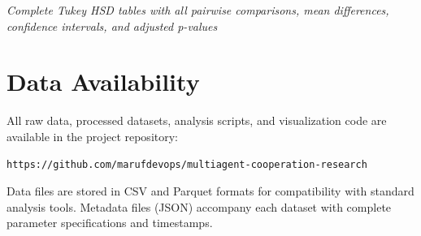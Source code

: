 \textit{Complete Tukey HSD tables with all pairwise comparisons, mean differences, confidence intervals, and adjusted p-values}

\section{Data Availability}

All raw data, processed datasets, analysis scripts, and visualization code are available in the project repository:

\begin{verbatim}
https://github.com/marufdevops/multiagent-cooperation-research
\end{verbatim}

Data files are stored in CSV and Parquet formats for compatibility with standard analysis tools. Metadata files (JSON) accompany each dataset with complete parameter specifications and timestamps.

